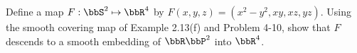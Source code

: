Define a map $F:\bbS^2\mapsto\bbR^4$ by $F(x,y,z) =(x^2-y^2, xy, xz, yz)$.  Using the smooth covering map of Example 2.13(f) and Problem 4-10, show that $F$ descends to a smooth embedding of $\bbR\bbP^2$ into $\bbR^4$.